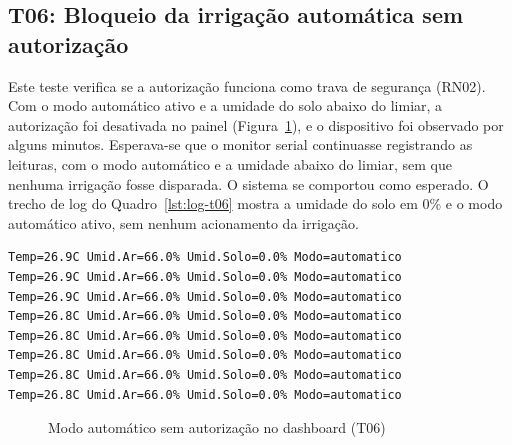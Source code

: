 \subsection{T06: Bloqueio da irrigação automática sem autorização}

Este teste verifica se a autorização funciona como trava de segurança (RN02). Com o modo automático ativo e a umidade do solo abaixo do limiar, a autorização foi desativada no painel (Figura~\ref{fig:t06-painel}), e o dispositivo foi observado por alguns minutos. Esperava-se que o monitor serial continuasse registrando as leituras, com o modo automático e a umidade abaixo do limiar, sem que nenhuma irrigação fosse disparada. O sistema se comportou como esperado. O trecho de log do Quadro~\ref{lst:log-t06} mostra a umidade do solo em 0\% e o modo automático ativo, sem nenhum acionamento da irrigação.

\vspace{0.6\baselineskip}
\noindent\begin{minipage}{\linewidth}
\begin{lstlisting}[language={}, caption={Log do monitor serial com a irrigação automática não autorizada (T06)}, label={lst:log-t06}]
Temp=26.9C Umid.Ar=66.0% Umid.Solo=0.0% Modo=automatico
Temp=26.9C Umid.Ar=66.0% Umid.Solo=0.0% Modo=automatico
Temp=26.9C Umid.Ar=66.0% Umid.Solo=0.0% Modo=automatico
Temp=26.8C Umid.Ar=66.0% Umid.Solo=0.0% Modo=automatico
Temp=26.8C Umid.Ar=66.0% Umid.Solo=0.0% Modo=automatico
Temp=26.8C Umid.Ar=66.0% Umid.Solo=0.0% Modo=automatico
Temp=26.8C Umid.Ar=66.0% Umid.Solo=0.0% Modo=automatico
Temp=26.8C Umid.Ar=66.0% Umid.Solo=0.0% Modo=automatico
\end{lstlisting}
\vspace{-0.5\baselineskip}
\end{minipage}
\medskip

\begin{figure}[htbp]
  \centering
  \caption{Modo automático sem autorização no dashboard (T06)}
  \label{fig:t06-painel}
\end{figure}

